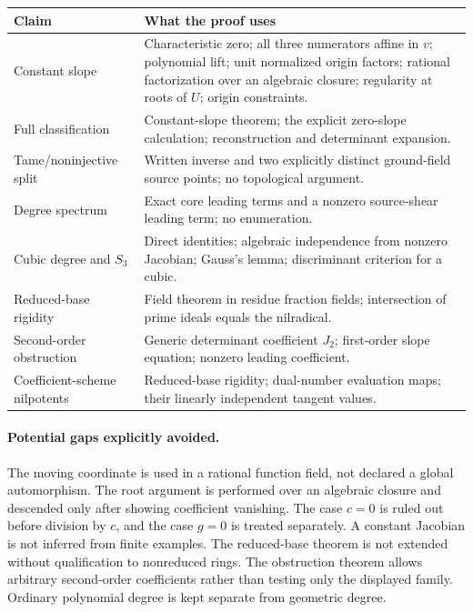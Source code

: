 \documentclass[11pt,a4paper]{article}
\numberwithin{equation}{section}
\theoremstyle{definition}
\theoremstyle{remark}
\begin{document}
\begin{center}
\small
\begin{tabular}{@{}p{}p{}@{}}
\toprule
Claim & What the proof uses\\
\midrule
Constant slope & Characteristic zero; all three numerators affine in $v$;
 polynomial lift; unit normalized origin factors; rational factorization
 over an algebraic closure; regularity at roots of $U$; origin
 constraints.\\
Full classification & Constant-slope theorem; the explicit zero-slope
 calculation; reconstruction and determinant expansion.\\
Tame/noninjective split & Written inverse and two explicitly distinct
 ground-field source points; no topological argument.\\
Degree spectrum & Exact core leading terms and a nonzero source-shear
 leading term; no enumeration.\\
Cubic degree and $S_3$ & Direct identities; algebraic independence from
 nonzero Jacobian; Gauss's lemma; discriminant criterion for a cubic.\\
Reduced-base rigidity & Field theorem in residue fraction fields;
 intersection of prime ideals equals the nilradical.\\
Second-order obstruction & Generic determinant coefficient $J_2$;
 first-order slope equation; nonzero leading coefficient.\\
Coefficient-scheme nilpotents & Reduced-base rigidity; dual-number
 evaluation maps; their linearly independent tangent values.\\
\bottomrule
\end{tabular}
\end{center}

\paragraph{Potential gaps explicitly avoided.}
The moving coordinate is used in a rational function field, not declared
a global automorphism. The root argument is performed over an algebraic
closure and descended only after showing coefficient vanishing. The case
$c=0$ is ruled out before division by $c$, and the case $g=0$ is treated
separately. A constant Jacobian is not inferred from finite examples.
The reduced-base theorem is not extended without qualification to
nonreduced rings. The obstruction theorem allows arbitrary second-order
coefficients rather than testing only the displayed family. Ordinary
polynomial degree is kept separate from geometric degree.
\end{document}
